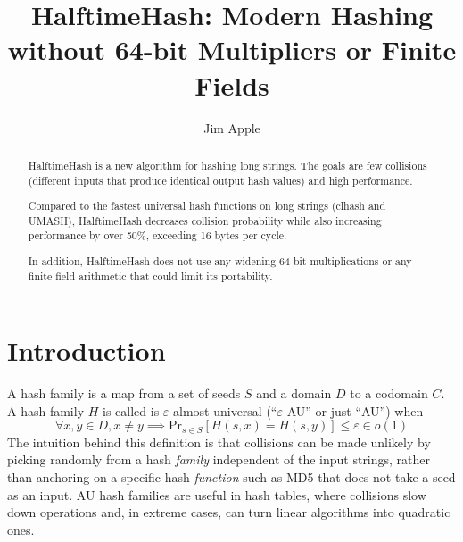 \documentclass[runningheads]{llncs}
\begin{document}
\title{HalftimeHash: Modern Hashing without 64-bit Multipliers or Finite Fields}
\author{Jim Apple
}
\maketitle

\begin{abstract}
HalftimeHash is a new algorithm for hashing long strings.
The goals are few collisions (different inputs that produce identical output hash values) and high performance.

Compared to the fastest universal hash functions on long strings (clhash and UMASH), HalftimeHash decreases collision probability while also increasing performance by over 50\%, exceeding 16 bytes per cycle.

In addition, HalftimeHash does not use any widening 64-bit multiplications or any finite field arithmetic that could limit its portability.

\end{abstract}

\section{Introduction}
A hash family is a map from a set of seeds $S$ and a domain $D$ to a codomain $C$.
A hash family $H$ is called is $\varepsilon$-almost universal (``$\varepsilon$-AU'' or just ``AU'') when
\[
\forall x,y \in D, x \neq y \implies \mathrm{Pr}_{s \in S}[H(s, x) = H(s, y)] \leq \varepsilon \in o(1)
\]
The intuition behind this definition is that collisions can be made unlikely by picking randomly from a hash {\em family} independent of the input strings, rather than anchoring on a specific hash {\em function} such as MD5 that does not take a seed as an input. AU hash families are useful in hash tables, where collisions slow down operations and, in extreme cases, can turn linear algorithms into quadratic ones. \cite{impala-quadratic,algorithm-attack,rust-quadratic,tabulation}
\end{document}

